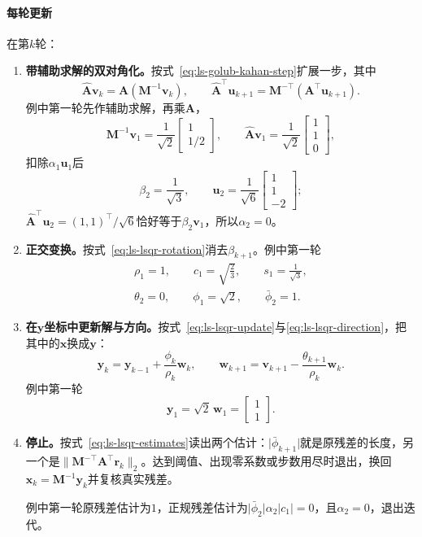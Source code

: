 \paragraph{每轮更新}
在第$k$轮：
\begin{enumerate}
 \item \textbf{带辅助求解的双对角化。}按式~\eqref{eq:ls-golub-kahan-step}扩展一步，其中
 \begin{equation}
  \widehat{\bm A}\bm v_k=\bm A(\bm M^{-1}\bm v_k),\qquad \widehat{\bm A}^\top\bm u_{k+1}=\bm M^{-\top}(\bm A^\top\bm u_{k+1}).
  \label{eq:ls-preconditioned-lsqr-products}
 \end{equation}
 例中第一轮先作辅助求解，再乘$\bm A$，
 \[
  \bm M^{-1}\bm v_1=\frac1{\sqrt2}\begin{bmatrix}1\\1/2\end{bmatrix},\qquad
  \widehat{\bm A}\bm v_1=\frac1{\sqrt2}\begin{bmatrix}1\\1\\0\end{bmatrix},
 \]
 扣除$\alpha_1\bm u_1$后
 \[
  \beta_2=\frac1{\sqrt3},\qquad \bm u_2=\frac1{\sqrt6}\begin{bmatrix}1\\1\\-2\end{bmatrix};
 \]
 $\widehat{\bm A}^\top\bm u_2=(1,1)^\top/\sqrt6$恰好等于$\beta_2\bm v_1$，所以$\alpha_2=0$。

 \item \textbf{正交变换。}按式~\eqref{eq:ls-lsqr-rotation}消去$\beta_{k+1}$。例中第一轮
 \[
  \begin{gathered}
  \rho_1=1,\qquad c_1=\sqrt{\frac23},\qquad s_1=\frac1{\sqrt3},\\
  \theta_2=0,\qquad \phi_1=\sqrt2,\qquad \bar\phi_2=1 .
  \end{gathered}
 \]

 \item \textbf{在$\bm y$坐标中更新解与方向。}按式~\eqref{eq:ls-lsqr-update}与\eqref{eq:ls-lsqr-direction}，把其中的$\bm x$换成$\bm y$：
 \[
  \bm y_k=\bm y_{k-1}+\frac{\phi_k}{\rho_k}\bm w_k,\qquad \bm w_{k+1}=\bm v_{k+1}-\frac{\theta_{k+1}}{\rho_k}\bm w_k .
 \]
 例中第一轮
 \[
  \bm y_1=\sqrt2\,\bm w_1=\begin{bmatrix}1\\1\end{bmatrix}.
 \]

 \item \textbf{停止。}按式~\eqref{eq:ls-lsqr-estimates}读出两个估计：$\lvert\bar\phi_{k+1}\rvert$就是原残差的长度，另一个是$\lVert\bm M^{-\top}\bm A^\top\bm r_k\rVert_2$。达到阈值、出现零系数或步数用尽时退出，换回$\bm x_k=\bm M^{-1}\bm y_k$并复核真实残差。

 例中第一轮原残差估计为$1$，正规残差估计为$\lvert\bar\phi_2\rvert\alpha_2\lvert c_1\rvert=0$，且$\alpha_2=0$，退出迭代。
\end{enumerate}

